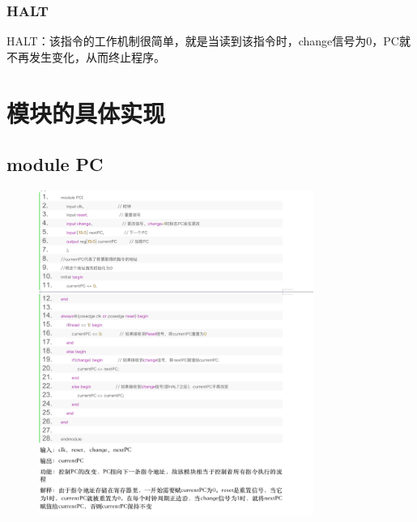 \documentclass{article}
\begin{document}
\subsubsection{HALT}
HALT：该指令的工作机制很简单，就是当读到该指令时，change信号为0，PC就不再发生变化，从而终止程序。

\section{模块的具体实现}

\subsection{module PC}
\begin{figure}[H]
    \centering
    \includegraphics[width=0.8\textwidth]{pic/10.png}
   
    \end{figure}
\end{document}
